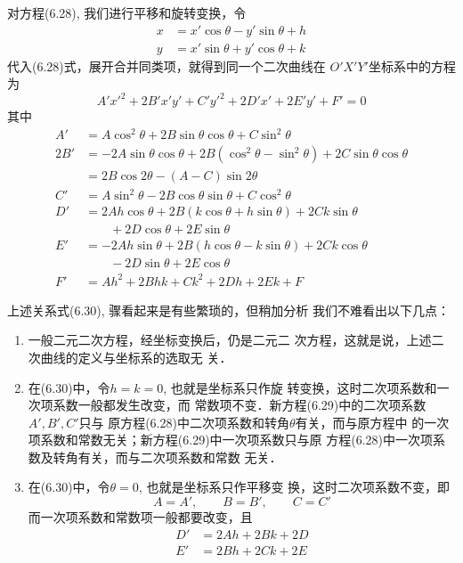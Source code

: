 对方程(6.28), 我们进行平移和旋转变换，令
\[\begin{split}
    x&=x'\cos\theta-y'\sin\theta+h\\
y&=x'\sin\theta+y'\cos\theta+k
\end{split}\]
代入(6.28)式，展开合并同类项，就得到同一个二次曲线在
$O'X'Y'$坐标系中的方程为
\begin{equation}
    A'{x'}^2+2B'x'y'+C'{y'}^2+2D'x'+2E'y'+F'=0
\end{equation}
其中
\begin{equation}
\begin{split}
    A'&=A\cos^2\theta +2B\sin\theta \cos\theta +C\sin^2\theta \\
2B'&=-2A\sin\theta \cos\theta +2B(\cos^2\theta -\sin^2\theta)+2C\sin\theta \cos\theta\\
 &=2B\cos2\theta-(A-C)\sin2\theta \\
C'&=A\sin^2\theta -2B\cos\theta \sin\theta +C\cos^2\theta \\
D'&=2Ah\cos\theta +2B(k\cos\theta +h\sin\theta )+2Ck\sin\theta\\
&\qquad +2D\cos\theta +2E\sin\theta \\
E'&=-2Ah\sin\theta +2B(h\cos\theta -k\sin\theta)+2Ck\cos\theta\\
&\qquad  -2D\sin\theta +2E\cos\theta \\
F'&=Ah^2+2Bhk+Ck^2+2Dh+2Ek+F
\end{split}
\end{equation}

上述关系式(6.30), 骤看起来是有些繁琐的，但稍加分析
我们不难看出以下几点：
\begin{enumerate}
\item 一般二元二次方程，经坐标变换后，仍是二元二
次方程，这就是说，上述二次曲线的定义与坐标系的选取无
关．
\item 在(6.30)中，令$h=k=0$, 也就是坐标系只作旋
转变换，这时二次项系数和一次项系数一般都发生改变，而
常数项不变．新方程(6.29)中的二次项系数$A',B',C'$只与
原方程(6.28)中二次项系数和转角$\theta$有关，而与原方程中
的一次项系数和常数无关；新方程(6.29)中一次项系数只与原
方程(6.28)中一次项系数及转角有关，而与二次项系数和常数
无关．
\item 在(6.30)中，令$\theta=0$, 也就是坐标系只作平移变
换，这时二次项系数不变，即
\[A=A',\qquad B=B',\qquad C=C'\]
而一次项系数和常数项一般都要改变，且
\begin{equation}
    \begin{split}
D'&=2Ah+2Bk+2D\\
E'&=2Bh+2Ck+2E        
    \end{split}
\end{equation}
\end{enumerate}

